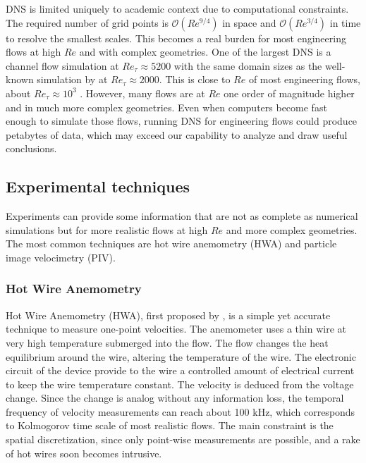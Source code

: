 DNS is limited uniquely to academic context due to computational constraints. The required number of grid points is $ \mathcal{O}\left(Re^{9/4}\right) $ in space and $ \mathcal{O}\left(Re^{3/4}\right) $ in time to resolve the smallest scales. This becomes a real burden for most engineering flows at high $ Re $ and with complex geometries. One of the largest DNS is a channel flow simulation at $ Re_{\tau}\approx 5200 $ \citep{lee2015direct} with the same domain sizes as the well-known simulation by \citet{hoyas2006scaling} at $ Re_{\tau}\approx 2000 $. This is close to $ Re $ of most engineering flows, about $ Re_{\tau}\approx 10^3 $ \citep{smits2013wall}. However, many flows are at $ Re $ one order of magnitude higher and in much more complex geometries. Even when computers become fast enough to simulate those flows, running DNS for engineering flows could produce petabytes of data, which may exceed our capability to analyze and draw useful conclusions.

\subsection{Experimental techniques}
Experiments can provide some information that are not as complete as numerical simulations but for more realistic flows at high $ Re $ and more complex geometries. The most common techniques are hot wire anemometry (HWA) and particle image velocimetry (PIV).

\subsubsection{Hot Wire Anemometry}  
Hot Wire Anemometry (HWA), first proposed by \citet{king1914convection}, is a simple yet accurate technique to measure one-point velocities. The anemometer uses a thin wire at very high temperature submerged into the flow. The flow changes the heat equilibrium around the wire, altering the temperature of the wire. The electronic circuit of the device provide to the wire a controlled amount of electrical current to keep the wire temperature constant. The velocity is deduced from the voltage change. Since the change is analog without any information loss, the temporal frequency of velocity measurements can reach about 100 kHz, which corresponds to Kolmogorov time scale of most realistic flows. The main constraint is the spatial discretization, since only point-wise measurements are possible, and a rake of hot wires soon becomes intrusive.

